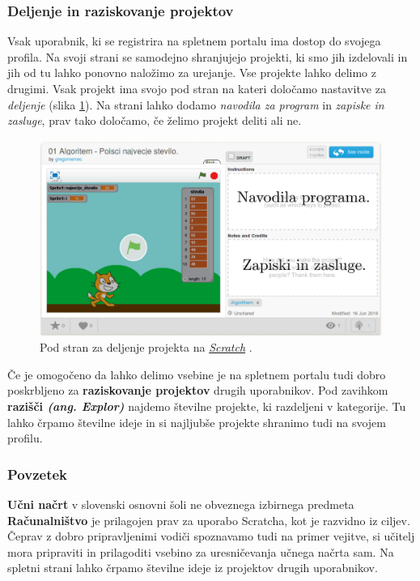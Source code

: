 \subsubsection{Deljenje in raziskovanje projektov}
\label{sec:deljenje_vsebin}

Vsak uporabnik, ki se registrira na spletnem portalu ima dostop do
svojega profila. Na svoji strani se samodejno shranjujejo projekti, ki
smo jih izdelovali in jih od tu lahko ponovno naložimo za
urejanje. Vse projekte lahko delimo z drugimi. Vsak projekt ima svojo
pod stran na kateri določamo nastavitve za \emph{deljenje} (slika
\ref{fig:web:scratch:deljenje}). Na strani lahko dodamo \emph{navodila
  za program} in \emph{zapiske in zasluge}, prav tako določamo, če
želimo projekt deliti ali ne.

\begin{figure}[h!]
  \centering
    \includegraphics [width=0.50\linewidth, keepaspectratio =
   1] {./images/sc_web/scratch_deljenje-v01o.png}
   \caption{Pod stran za deljenje projekta na
     \emph{\href{https://scratch.mit.edu/}{Scratch}}
     \cite{web:scratch}.}
    \label{fig:web:scratch:deljenje}
\end{figure}

Če je omogočeno da lahko delimo vsebine je na spletnem portalu tudi
dobro poskrbljeno za \textbf{raziskovanje projektov} drugih
uporabnikov. Pod zavihkom \textbf{razišči \emph{(ang. Explor)}}
najdemo številne projekte, ki razdeljeni v kategorije. Tu lahko črpamo
številne ideje in si najljubše projekte shranimo tudi na svojem
profilu.

\subsubsection{Povzetek}
\label{sec:scratch_povzetek}

\textbf{Učni načrt} v slovenski osnovni šoli ne obveznega izbirnega
predmeta \textbf{Računalništvo} je prilagojen prav za uporabo
Scratcha, kot je razvidno iz ciljev. Čeprav z dobro pripravljenimi
vodiči spoznavamo tudi na primer vejitve, si učitelj mora pripraviti
in prilagoditi vsebino za uresničevanja učnega načrta sam. Na spletni
strani lahko črpamo številne ideje iz projektov drugih uporabnikov.

